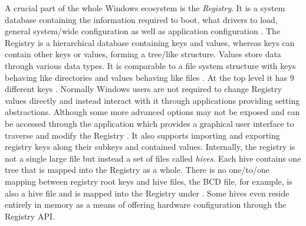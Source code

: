 A crucial part of the whole Windows ecosystem is the \emph{Registry}.
It is a system database containing the information required to boot, what drivers to load, general system\-/wide configuration as well as application configuration \cite[Section 1]{windows-internals-7-part1}.
The Registry is a hierarchical database containing keys and values, whereas keys can contain other keys or values, forming a tree\-/like structure.
Values store data through various data types.
It is comparable to a file system structure with keys behaving like directories and values behaving like files \cite[Section 10]{windows-internals-7-part2}.
At the top level it has 9 different keys \cite[Section 10]{windows-internals-7-part2}.
Normally Windows users are not required to change Registry values directly and instead interact with it through applications providing setting abstractions.
Although some more advanced options may not be exposed and can be accessed through the  application which provides a graphical user interface to traverse and modify the Registry \cite[Section 10]{windows-internals-7-part2}.
It also supports importing and exporting registry keys along their subkeys and contained values.
Internally, the registry is not a single large file but instead a set of files called \emph{hives}.
Each hive contains one tree that is mapped into the Registry as a whole.
There is no one\-/to\-/one mapping between registry root keys and hive files, the \ac{BCD} file, for example, is also a hive file and is mapped into the Registry under  \cite[Section 10]{windows-internals-7-part2}.
Some hives even reside entirely in memory as a means of offering hardware configuration through the Registry \ac{API}.

